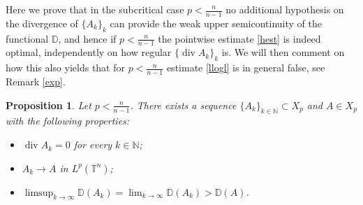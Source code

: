 \documentclass[10pt,reqno]{amsart}
\numberwithin{equation}{section}
\newcommand{\T}{\mathbb{T}}
\newcommand{\N}{\mathbb{N}}
\newcommand{\D}{\mathbb{D}}
\DeclareMathOperator{\dv}{div}
\theoremstyle{plain}
\newtheorem{prop}[Teo]{Proposition}
\theoremstyle{definition}
\theoremstyle{remark}
\begin{document}
Here we prove that in the subcritical case $p<\frac{n}{n-1}$ no additional hypothesis on the divergence of $\{A_k\}_k$ can provide the weak upper semicontinuity of the functional $\D$, and hence if $p < \frac{n}{n - 1}$ the pointwise estimate \eqref{hest} is indeed optimal, independently on how regular $\{\dv A_k\}_k$ is. We will then comment on how this also yields that for $p < \frac{n}{n - 1}$ estimate \eqref{llogl} is in general false, see Remark \ref{exp}.
\begin{prop}\label{counter}
Let $p<\frac{n}{n-1}$. There exists a sequence $\{A_k\}_{k\in \N}\subset X_p$ and $A\in X_p$ with the following properties:
\begin{itemize}
\item[(i)]  $\dv A_k =0$ for every $k\in\N$;
\item[(ii)] $A_k\rightarrow A$ in $L^p(\T^n)$;
\item[(iii)] $\limsup_{k\rightarrow \infty} \mathbb{D} (A_k)=\lim_{k\rightarrow \infty} \mathbb{D} (A_k)> \mathbb{D} (A)$.
\end{itemize}
\end{prop}
\end{document}
